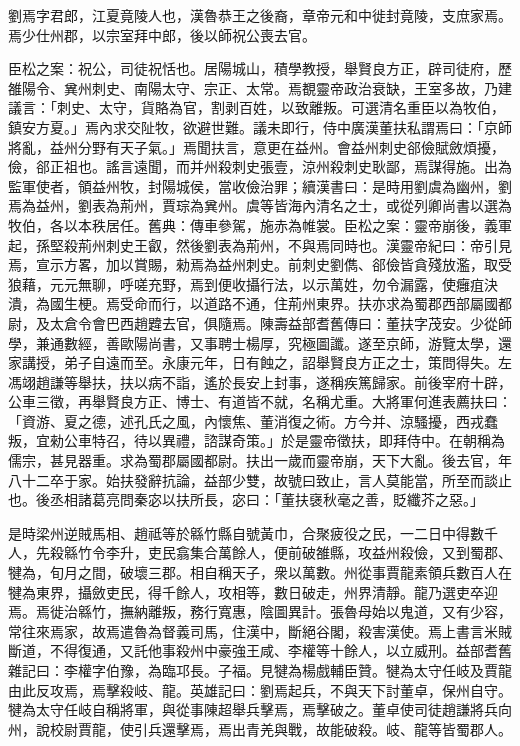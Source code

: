 
\begin{pinyinscope}
劉焉字君郎，江夏竟陵人也，漢魯恭王之後裔，章帝元和中徙封竟陵，支庶家焉。焉少仕州郡，以宗室拜中郎，後以師祝公喪去官。

臣松之案：祝公，司徒祝恬也。居陽城山，積學教授，舉賢良方正，辟司徒府，歷雒陽令、兾州刺史、南陽太守、宗正、太常。焉覩靈帝政治衰缺，王室多故，乃建議言：「刺史、太守，貨賂為官，割剥百姓，以致離叛。可選清名重臣以為牧伯，鎮安方夏。」焉內求交阯牧，欲避世難。議未即行，侍中廣漢董扶私謂焉曰：「京師將亂，益州分野有天子氣。」焉聞扶言，意更在益州。會益州刺史郤儉賦斂煩擾，儉，郤正祖也。謠言遠聞，而并州殺刺史張壹，涼州殺刺史耿鄙，焉謀得施。出為監軍使者，領益州牧，封陽城侯，當收儉治罪；續漢書曰：是時用劉虞為幽州，劉焉為益州，劉表為荊州，賈琮為兾州。虞等皆海內清名之士，或從列卿尚書以選為牧伯，各以本秩居任。舊典：傳車參駕，施赤為帷裳。臣松之案：靈帝崩後，義軍起，孫堅殺荊州刺史王叡，然後劉表為荊州，不與焉同時也。漢靈帝紀曰：帝引見焉，宣示方畧，加以賞賜，勑焉為益州刺史。前刺史劉儁、郤儉皆貪殘放濫，取受狼藉，元元無聊，呼嗟充野，焉到便收攝行法，以示萬姓，勿令漏露，使癰疽決潰，為國生梗。焉受命而行，以道路不通，住荊州東界。扶亦求為蜀郡西部屬國都尉，及太倉令會巴西趙韙去官，俱隨焉。陳壽益部耆舊傳曰：董扶字茂安。少從師學，兼通數經，善歐陽尚書，又事聘士楊厚，究極圖讖。遂至京師，游覽太學，還家講授，弟子自遠而至。永康元年，日有蝕之，詔舉賢良方正之士，策問得失。左馮翊趙謙等舉扶，扶以病不詣，遙於長安上封事，遂稱疾篤歸家。前後宰府十辟，公車三徵，再舉賢良方正、博士、有道皆不就，名稱尤重。大將軍何進表薦扶曰：「資游、夏之德，述孔氏之風，內懷焦、董消復之術。方今并、涼騷擾，西戎蠢叛，宜勑公車特召，待以異禮，諮謀奇策。」於是靈帝徵扶，即拜侍中。在朝稱為儒宗，甚見器重。求為蜀郡屬國都尉。扶出一歲而靈帝崩，天下大亂。後去官，年八十二卒于家。始扶發辭抗論，益部少雙，故號曰致止，言人莫能當，所至而談止也。後丞相諸葛亮問秦宓以扶所長，宓曰：「董扶襃秋毫之善，貶纖芥之惡。」

是時梁州逆賊馬相、趙祗等於緜竹縣自號黃巾，合聚疲役之民，一二日中得數千人，先殺緜竹令李升，吏民翕集合萬餘人，便前破雒縣，攻益州殺儉，又到蜀郡、犍為，旬月之間，破壞三郡。相自稱天子，衆以萬數。州從事賈龍素領兵數百人在犍為東界，攝斂吏民，得千餘人，攻相等，數日破走，州界清靜。龍乃選吏卒迎焉。焉徙治緜竹，撫納離叛，務行寬惠，陰圖異計。張魯母始以鬼道，又有少容，常往來焉家，故焉遣魯為督義司馬，住漢中，斷絕谷閣，殺害漢使。焉上書言米賊斷道，不得復通，又託他事殺州中豪強王咸、李權等十餘人，以立威刑。益部耆舊雜記曰：李權字伯豫，為臨邛長。子福。見犍為楊戲輔臣贊。犍為太守任岐及賈龍由此反攻焉，焉擊殺岐、龍。英雄記曰：劉焉起兵，不與天下討董卓，保州自守。犍為太守任岐自稱將軍，與從事陳超舉兵擊焉，焉擊破之。董卓使司徒趙謙將兵向州，說校尉賈龍，使引兵還擊焉，焉出青羌與戰，故能破殺。岐、龍等皆蜀郡人。


\end{pinyinscope}
